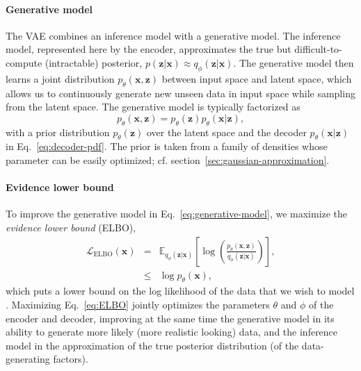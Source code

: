 \documentclass[english,a4paper,10pt]{scrartcl}
\begin{document}
\paragraph{Generative model}
The VAE combines an inference model with a generative model. The inference model, represented here by the encoder, approximates the true but difficult-to-compute (intractable) posterior, $p(\mathbf{z}|\mathbf{x})\approx q_{\phi}(\mathbf{z}|\mathbf{x})$. The generative model then learns a joint distribution $p_{\theta}(\mathbf{x},\mathbf{z})$ between input space and latent space, which allows us to continuously generate new unseen data in input space while sampling from the latent space. The generative model is typically factorized as
\begin{equation}
    p_{\theta}(\mathbf{x},\mathbf{z})=p_{\theta}(\mathbf{z})p_{\theta}(\mathbf{x}|\mathbf{z}),\label{eq:generative-model}
\end{equation}
with a prior distribution $p_{\theta}(\mathbf{z})$ over the latent space and the decoder $p_{\theta}(\mathbf{x}|\mathbf{z})$ in Eq.~\eqref{eq:decoder-pdf}. The prior is taken from a family of densities whose parameter can be easily optimized; cf. section~\ref{sec:gaussian-approximation}.

\paragraph{Evidence lower bound}
To improve the generative model in Eq.~\eqref{eq:generative-model}, we maximize the \emph{evidence lower bound} (ELBO),
\begin{subequations}
    \begin{eqnarray}
        \mathcal{L}_{\mathrm{ELBO}}(\mathbf{x}) &=& \mathbb{E}_{q_{\phi}(\mathbf{z}|\mathbf{x})}\left[\log\left(\frac{p_{\theta}(\mathbf{x},\mathbf{z})}{q_{\phi}(\mathbf{z}|\mathbf{x})}\right)\right],\label{eq:ELBO} \\
        &\leq& \log p_{\theta}(\mathbf{x}),
    \end{eqnarray}
\end{subequations}
which puts a lower bound on the log likelihood of the data that we wish to model \citep{Kingma.Welling.2014}. Maximizing Eq.~\eqref{eq:ELBO} jointly optimizes the parameters $\theta$ and $\phi$ of the encoder and decoder, improving at the same time the generative model in its ability to generate more likely (more realistic looking) data, and the inference model in the approximation of the true posterior distribution (of the data-generating factors).
\end{document}

